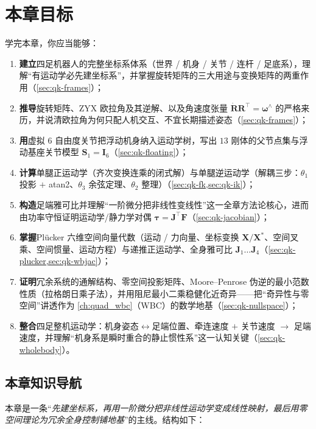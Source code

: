 \section*{本章目标}
学完本章，你应当能够：
\begin{enumerate}
  \item \textbf{建立}四足机器人的完整坐标系体系（世界 / 机身 / 关节 / 连杆 / 足底系），理解“有运动学必先建坐标系”，并掌握旋转矩阵的三大用途与变换矩阵的两重作用（\cref{sec:qk-frames}）；
  \item \textbf{推导}旋转矩阵、ZYX 欧拉角及其逆解、以及角速度张量 $\dot{\mathbf{R}}\mathbf{R}^\top=\boldsymbol{\omega}^\wedge$ 的严格来历，并说清欧拉角为何只配人机交互、不宜长期描述姿态（\cref{sec:qk-frames}）；
  \item \textbf{用}虚拟 $6$ 自由度关节把浮动机身纳入运动学树，写出 $13$ 刚体的父节点集与浮动基座关节模型 $\mathbf{S}_1=\mathbf{I}_6$（\cref{sec:qk-floating}）；
  \item \textbf{计算}单腿正运动学（齐次变换连乘的闭式解）与单腿逆运动学（解耦三步：$\theta_1$ 投影 $+$ atan2、$\theta_3$ 余弦定理、$\theta_2$ 整理）（\cref{sec:qk-fk,sec:qk-ik}）；
  \item \textbf{构造}足端雅可比并理解“一阶微分把非线性变线性”这一全章方法论核心，进而由功率守恒证明运动学/静力学对偶 $\boldsymbol{\tau}=\mathbf{J}^\top\mathbf{F}$（\cref{sec:qk-jacobian}）；
  \item \textbf{掌握}Plücker 六维空间向量代数（运动 / 力向量、坐标变换 $\mathbf{X}/\mathbf{X}^*$、空间叉乘、空间惯量、运动方程）与递推正运动学、全身雅可比 $\mathbf{J}_1\dots\mathbf{J}_4$（\cref{sec:qk-plucker,sec:qk-wbjac}）；
  \item \textbf{证明}冗余系统的通解结构、零空间投影矩阵、Moore--Penrose 伪逆的最小范数性质（拉格朗日乘子法），并用阻尼最小二乘稳健化近奇异——把“奇异性与零空间”讲透作为 \cref{ch:quad_wbc}（WBC）的数学地基（\cref{sec:qk-nullspace}）；
  \item \textbf{整合}四足整机运动学：机身姿态$\leftrightarrow$足端位置、牵连速度 $+$ 关节速度 $\to$ 足端速度，并理解“机身系是瞬时重合的静止惯性系”这一认知关键（\cref{sec:qk-wholebody}）。
\end{enumerate}

\subsection*{本章知识导航}
本章是一条“\emph{先建坐标系，再用一阶微分把非线性运动学变成线性映射，最后用零空间理论为冗余全身控制铺地基}”的主线。结构如下：


